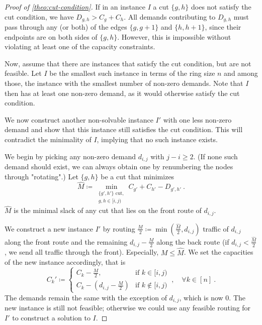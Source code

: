 \begin{proof}[Proof of \cref{theo:cut-condition}]
	If in an instance $I$ a cut $\{g, h\}$ does not satisfy the cut condition, we have $D_{g, h} > C_g + C_h$.
	All demands contributing to $D_{g, h}$ must pass through any (or both) of the edges $\{g, g+1\}$ and $\{h, h+1\}$, since their endpoints are on both sides of $\{g, h\}$.
	However, this is impossible without violating at least one of the capacity constraints.
	
	Now, assume that there are instances that satisfy the cut condition, but are not feasible.
	Let $I$ be the smallest such instance in terms of the ring size $n$ and among those, the instance with the smallest number of non-zero demands.
	Note that $I$ then has at least one non-zero demand, as it would otherwise satisfy the cut condition.
	
	We now construct another non-solvable instance $I'$ with one less non-zero demand and show that this instance still satisfies the cut condition.
	This will contradict the minimality of $I$, implying that no such instance exists.
	
 	We begin by picking any non-zero demand $d_{i,j}$ with $j - i \geq 2$.
 	(If none such demand should exist, we can always obtain one by renumbering the nodes through "rotating".)
 	Let $\{g, h\}$ be a cut that minimizes
 	\begin{equation}
 		\widehat{M} \coloneqq \min_{\substack{ \{g', h'\} \text{ cut},\\ g, h \in [i, j)}}
 		C_{g'} + C_{h'} - D_{g', h'} \ .
 	\end{equation}
 	$\widehat{M}$ is the minimal slack of any cut that lies on the front route of $d_{i, j}$.
	
	We construct a new instance $I'$ by routing $\frac{M}{2} \coloneqq \min(\frac{\widehat{M}}{2}, d_{i, j})$ traffic of $d_{i,j}$ along the front route and the remaining $d_{i,j} - \frac{M}{2}$ along the back route (if $d_{i,j} < \frac{\widehat{M}}{2}$, we send all traffic through the front).
	Especially, $M \leq \widehat{M}$.
	We set the capacities of the new instance accordingly, that is
	\begin{equation}
		C_k' \coloneqq 
		\begin{cases}
			C_k - \frac{M}{2}, & \text{if } k \in [i, j)\\
			C_k - (d_{i,j} - \frac{M}{2}) & \text{if } k \notin [i, j)
		\end{cases} \ , \quad \forall k \in [n] \ .
	\end{equation}
	The demands remain the same with the exception of $d_{i,j}$, which is now $0$.
	The new instance is still not feasible; otherwise we could use any feasible routing for $I'$ to construct a solution to $I$.
	

\end{proof}
